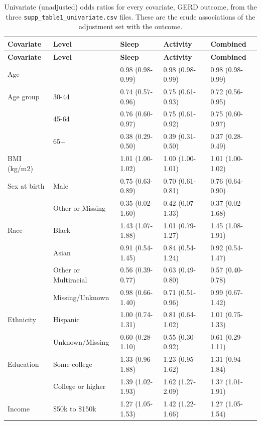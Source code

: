 \documentclass[11pt]{article}
\newcommand{\code}[1]{\texttt{\small #1}}
\begin{document}
\footnotesize\begin{longtable}{@{}p{3.4cm}p{2.6cm}p{2.3cm}p{2.3cm}p{2.3cm}@{}}
\caption{Univariate (unadjusted) odds ratios for every covariate, GERD outcome, from the three \code{supp\_table1\_univariate.csv} files. These are the crude associations of the adjustment set with the outcome.}\label{tab:res-cov-gerd}\\
\toprule \textbf{Covariate} & \textbf{Level} & \textbf{Sleep} & \textbf{Activity} & \textbf{Combined} \\ \midrule \endfirsthead
\toprule \textbf{Covariate} & \textbf{Level} & \textbf{Sleep} & \textbf{Activity} & \textbf{Combined} \\ \midrule \endhead
Age &  & 0.98 (0.98-0.99) & 0.98 (0.98-0.99) & 0.98 (0.98-0.99) \\
Age group & 30-44 & 0.74 (0.57-0.96) & 0.75 (0.61-0.93) & 0.72 (0.56-0.95) \\
 & 45-64 & 0.76 (0.60-0.97) & 0.75 (0.61-0.92) & 0.75 (0.60-0.97) \\
 & 65+ & 0.38 (0.29-0.50) & 0.39 (0.31-0.50) & 0.37 (0.28-0.49) \\
BMI (kg/m2) &  & 1.01 (1.00-1.02) & 1.00 (1.00-1.01) & 1.01 (1.00-1.02) \\
Sex at birth & Male & 0.75 (0.63-0.89) & 0.70 (0.61-0.81) & 0.76 (0.64-0.90) \\
 & Other or Missing & 0.35 (0.02-1.60) & 0.42 (0.07-1.33) & 0.37 (0.02-1.68) \\
Race & Black & 1.43 (1.07-1.88) & 1.01 (0.79-1.27) & 1.45 (1.08-1.91) \\
 & Asian & 0.91 (0.54-1.45) & 0.84 (0.54-1.24) & 0.92 (0.54-1.47) \\
 & Other or Multiracial & 0.56 (0.39-0.77) & 0.63 (0.49-0.80) & 0.57 (0.40-0.78) \\
 & Missing/Unknown & 0.98 (0.66-1.40) & 0.71 (0.51-0.96) & 0.99 (0.67-1.42) \\
Ethnicity & Hispanic & 1.00 (0.74-1.31) & 0.81 (0.64-1.02) & 1.01 (0.75-1.33) \\
 & Unknown/Missing & 0.60 (0.28-1.10) & 0.55 (0.30-0.92) & 0.61 (0.29-1.11) \\
Education & Some college & 1.33 (0.96-1.88) & 1.23 (0.95-1.62) & 1.31 (0.94-1.84) \\
 & College or higher & 1.39 (1.02-1.93) & 1.62 (1.27-2.09) & 1.37 (1.01-1.91) \\
Income & \$50k to \$150k & 1.27 (1.05-1.53) & 1.42 (1.22-1.66) & 1.27 (1.05-1.54) \\

\end{longtable}
\end{document}
